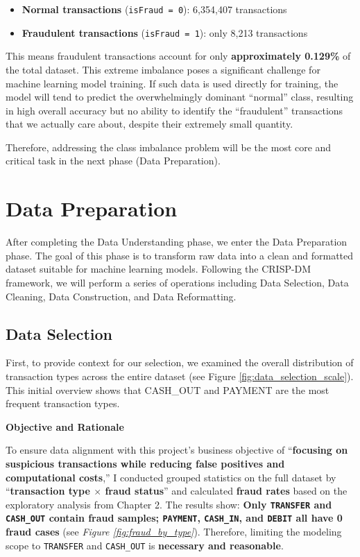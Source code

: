 \documentclass[sigplan,screen]{acmart}
\begin{document}
\begin{itemize}
    \item \textbf{Normal transactions} (\texttt{isFraud = 0}): 6,354,407 transactions
    \item \textbf{Fraudulent transactions} (\texttt{isFraud = 1}): only 8,213 transactions
\end{itemize}

This means fraudulent transactions account for only \textbf{approximately 0.129\%} of the total dataset. This extreme imbalance poses a significant challenge for machine learning model training. If such data is used directly for training, the model will tend to predict the overwhelmingly dominant ``normal'' class, resulting in high overall accuracy but no ability to identify the ``fraudulent'' transactions that we actually care about, despite their extremely small quantity.

Therefore, addressing the class imbalance problem will be the most core and critical task in the next phase (Data Preparation).

\section{Data Preparation}

After completing the Data Understanding phase, we enter the Data Preparation phase. The goal of this phase is to transform raw data into a clean and formatted dataset suitable for machine learning models. Following the CRISP-DM framework, we will perform a series of operations including Data Selection, Data Cleaning, Data Construction, and Data Reformatting.

\subsection{Data Selection}

First, to provide context for our selection, we examined the overall distribution of transaction types across the entire dataset (see Figure \ref{fig:data_selection_scale}). This initial overview shows that CASH\_OUT and PAYMENT are the most frequent transaction types.

\textbf{Objective and Rationale}

To ensure data alignment with this project's business objective of ``\textbf{focusing on suspicious transactions while reducing false positives and computational costs},'' I conducted grouped statistics on the full dataset by ``\textbf{transaction type $\times$ fraud status}'' and calculated \textbf{fraud rates} based on the exploratory analysis from Chapter 2. The results show: \textbf{Only \texttt{TRANSFER} and \texttt{CASH\_OUT} contain fraud samples; \texttt{PAYMENT}, \texttt{CASH\_IN}, and \texttt{DEBIT} all have 0 fraud cases} (see \textit{Figure \ref{fig:fraud_by_type}}). Therefore, limiting the modeling scope to \texttt{TRANSFER} and \texttt{CASH\_OUT} is \textbf{necessary and reasonable}.
\end{document}
